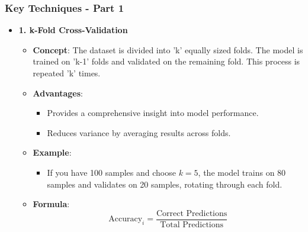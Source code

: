 \documentclass[aspectratio=169]{beamer}
\begin{document}
\begin{frame}[fragile]
    \frametitle{Key Techniques - Part 1}
    \begin{itemize}
        \item \textbf{1. k-Fold Cross-Validation}
        \begin{itemize}
            \item \textbf{Concept}: The dataset is divided into 'k' equally sized folds. The model is trained on 'k-1' folds and validated on the remaining fold. This process is repeated 'k' times.
            \item \textbf{Advantages}:
            \begin{itemize}
                \item Provides a comprehensive insight into model performance.
                \item Reduces variance by averaging results across folds.
            \end{itemize}
            \item \textbf{Example}:
            \begin{itemize}
                \item If you have 100 samples and choose $k=5$, the model trains on 80 samples and validates on 20 samples, rotating through each fold.
            \end{itemize}
            \item \textbf{Formula}:
            \begin{equation}
                \text{Accuracy}_i = \frac{\text{Correct Predictions}}{\text{Total Predictions}}
            \end{equation}
        \end{itemize}
    \end{itemize}
\end{frame}
\end{document}
